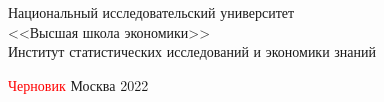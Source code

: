 \begingroup
\thispagestyle{empty}
\singlespace
\begin{center}
    Национальный исследовательский университет \\
    <<Высшая школа экономики>> \\
    Институт статистических исследований и экономики знаний
    \vfill
    {\Huge \myTitle}
    \vspace{7mm}

    {\large \mySubtitle}
    \if{}%
        \vspace{7mm}%
        \par%
        {\large \textcolor{red}{Черновик}}
    \fi
    \vfill
    \vfill
    Москва 2022
\end{center}
\endgroup
